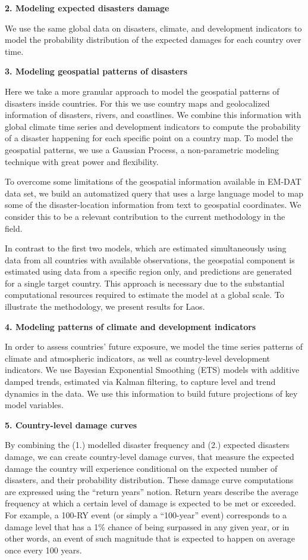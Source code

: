 \textbf{2. Modeling expected disasters damage}

We use the same global data on disasters, climate, and development indicators to model the probability distribution of the expected damages for each country over time.

\textbf{3. Modeling geospatial patterns of disasters}

Here we take a more granular approach to model the geospatial patterns of disasters inside countries. For this we use country maps and geolocalized information of disasters, rivers, and coastlines. We combine this information with global climate time series and development indicators to compute the probability of a disaster happening for each specific point on a country map. To model the geospatial patterns, we use a Gaussian Process, a non-parametric modeling technique with great power and flexibility.

To overcome some limitations of the geospatial information available in EM-DAT data set, we build an automatized query that uses a large language model to map some of the disaster-location information from text to geospatial coordinates. We consider this to be a relevant contribution to the current methodology in the field.

In contrast to the first two models, which are estimated simultaneously using data from all countries with available observations, the geospatial component is estimated using data from a specific region only, and predictions are generated for a single target country. This approach is necessary due to the substantial computational resources required to estimate the model at a global scale. To illustrate the methodology, we present results for Laos.

\textbf{4. Modeling patterns of climate and development indicators}

In order to assess countries' future exposure, we model the time series patterns of climate and atmospheric indicators, as well as country-level development indicators. We use Bayesian Exponential Smoothing (ETS) models with additive damped trends, estimated via Kalman filtering, to capture level and trend dynamics in the data. We use this information to build future projections of key model variables.

\textbf{5. Country-level damage curves}

By combining the (1.) modelled disaster frequency and (2.) expected disasters damage, we can create country-level damage curves, that measure the expected damage the country will experience conditional on the expected number of disasters, and their probability distribution. These damage curve computations are expressed using the ``return years'' notion. Return years describe the average frequency at which a certain level of damage is expected to be met or exceeded. For example, a 100-RY event (or simply a ``100-year'' event) corresponds to a damage level that has a 1\% chance of being surpassed in any given year, or in other words, an event of such magnitude that is expected to happen on average once every 100 years.

